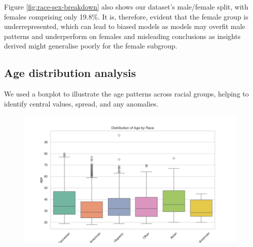 \documentclass[conference]{IEEEtran}
\begin{document}
	Figure \ref{fig:race-sex-breakdown} also shows our dataset's male/female split, with females comprising only 19.8\%. It is, therefore, evident that the female group is underrepresented, which can lead to biased models as models may overfit male patterns and underperform on females and misleading conclusions as insights derived might generalise poorly for the female subgroup.
	
	
	\subsection{Age distribution analysis}
	

	We used a boxplot to illustrate the age patterns across racial groups, helping to identify central values, spread, and any anomalies.

	\begin{figure}[H]
		\centering
		\includegraphics[width=0.9	\linewidth]{img/age_by_race_boxplot}
		\caption{}
		\label{fig:age-by-race-boxplot}
	\end{figure}
	
\end{document}
